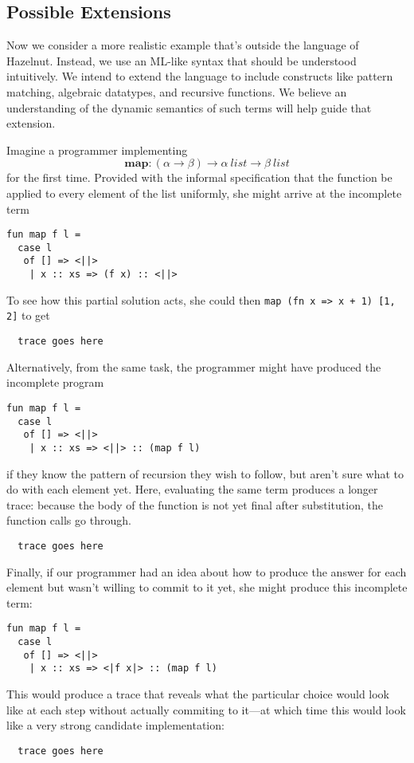 \subsection{Possible Extensions}
Now we consider a more realistic example that's outside the language of
Hazelnut. Instead, we use an ML-like syntax that should be understood
intuitively. We intend to extend the language to include constructs like
pattern matching, algebraic datatypes, and recursive functions. We believe
an understanding of the dynamic semantics of such terms will help guide
that extension.

Imagine a programmer implementing $$\mathbf{map} : (\alpha \to \beta) \to
\alpha ~\mathit{list} \to \beta ~\mathit{list}$$ for the first time.
Provided with the informal specification that the function be applied to
every element of the list uniformly, she might arrive at the incomplete term
\begin{verbatim}
fun map f l =
  case l
   of [] => <||>
    | x :: xs => (f x) :: <||>
\end{verbatim}
To see how this partial solution acts, she could then
\verb|map (fn x => x + 1) [1, 2]| to get
\begin{verbatim}
  trace goes here
\end{verbatim}
Alternatively, from the same task, the programmer might have produced the
incomplete program
\begin{verbatim}
fun map f l =
  case l
   of [] => <||>
    | x :: xs => <||> :: (map f l)
\end{verbatim}
if they know the pattern of recursion they wish to follow, but aren't sure
what to do with each element yet. Here, evaluating the same term produces a
longer trace: because the body of the function is not yet final after
substitution, the function calls go through.

\begin{verbatim}
  trace goes here
\end{verbatim}

Finally, if our programmer had an idea about how to produce the answer for
each element but wasn't willing to commit to it yet, she might produce this
incomplete term:
\begin{verbatim}
fun map f l =
  case l
   of [] => <||>
    | x :: xs => <|f x|> :: (map f l)
\end{verbatim}
This would produce a trace that reveals what the particular choice would
look like at each step without actually commiting to it---at which time
this would look like a very strong candidate implementation:
\begin{verbatim}
  trace goes here
\end{verbatim}
